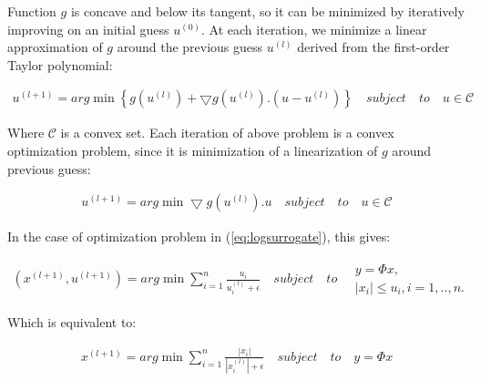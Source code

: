 Function $g$ is concave and below its tangent, so it can be minimized by iteratively improving on an initial guess $u^{\left ( 0 \right )}$.
At each iteration, we minimize a linear approximation of $g$ around the previous guess $u^{\left ( l \right )}$ derived from the first-order Taylor polynomial:

\begin{equation}
\begin{gathered}
u^{\left ( l+1 \right )} = arg \min\left \{ g\left ( u^{\left ( l \right )} \right ) + \bigtriangledown g\left ( u^{\left ( l \right )} \right ).\left ( u-u^{\left ( l \right )} \right ) \right \} 
\quad subject \quad to \quad u\in \mathcal{C}
\end{gathered}
\end{equation}

Where $\mathcal{C}$ is a convex set. Each iteration of above problem is a convex optimization problem, since it is minimization of a linearization of $g$ around previous guess:

\begin{equation}
\begin{gathered}
u^{\left ( l+1 \right )} = arg \min \bigtriangledown g\left ( u^{\left ( l \right )} \right ).u
\quad subject \quad to \quad u\in \mathcal{C}
\end{gathered}
\end{equation}

In the case of optimization problem in (\ref{eq:logsurrogate}), this gives:

\begin{equation}
\begin{gathered}
\left ( x^{\left ( l+1 \right )}, u^{\left ( l+1 \right )} \right ) =
arg \min \sum_{i=1}^{n}\frac{u_{i}}{u_{i}^{\left ( l \right )}+\epsilon }
\quad subject \quad to \quad \begin{matrix}
y=\Phi x,\\
\left | x_{i} \right | \leq u_{i}, i=1,..,n. 
\end{matrix}
\end{gathered}
\end{equation}

Which is equivalent to:

\begin{equation}
\label{eq:mmsolution}
\begin{gathered}
 x^{\left ( l+1 \right )} = arg \min \sum_{i=1}^{n} \frac{\left | x_{i} \right |}{\left | x_{i}^{\left ( l \right )} \right |+\epsilon }
\quad subject \quad to \quad y=\Phi x
\end{gathered}
\end{equation}

